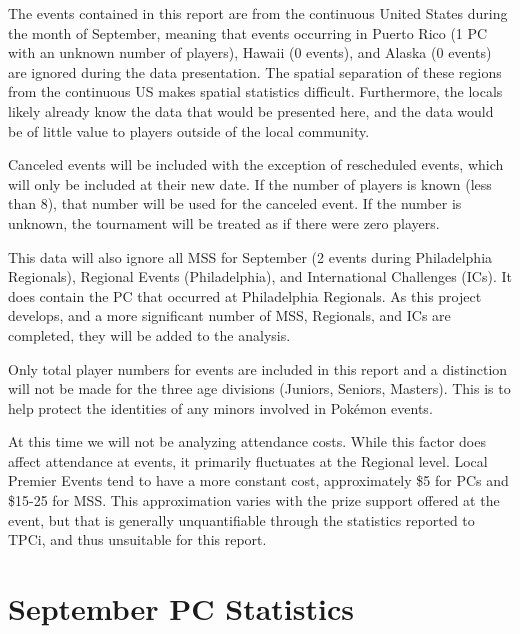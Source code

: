 \documentclass[11pt,twocolumn]{article}
\begin{document}
The events contained in this report are from the continuous United States during the month of September, meaning that events occurring in Puerto Rico (1 PC with an unknown number of players), Hawaii (0 events), and Alaska (0 events) are ignored during the data presentation. The spatial separation of these regions from the continuous US makes spatial statistics difficult. Furthermore, the locals likely already know the data that would be presented here, and the data would be of little value to players outside of the local community.

Canceled events will be included with the exception of rescheduled events, which will only be included at their new date. If the number of players is known (less than 8), that number will be used for the canceled event. If the number is unknown, the tournament will be treated as if there were zero players.

This data will also ignore all MSS for September (2 events during Philadelphia Regionals), Regional Events (Philadelphia), and International Challenges (ICs). It does contain the PC that occurred at Philadelphia Regionals. As this project develops, and a more significant number of MSS, Regionals, and ICs are completed, they will be added to the analysis. 

Only total player numbers for events are included in this report and a distinction will not be made for the three age divisions (Juniors, Seniors, Masters). This is to help protect the identities of any minors involved in Pokémon events.

At this time we will not be analyzing attendance costs. While this factor does affect attendance at events, it primarily fluctuates at the Regional level. Local Premier Events tend to have a more constant cost, approximately \$5 for PCs and \$15-25 for MSS. This approximation varies with the prize support offered at the event, but that is generally unquantifiable through the statistics reported to TPCi, and thus unsuitable for this report. 

\section*{September PC Statistics}
\end{document}
